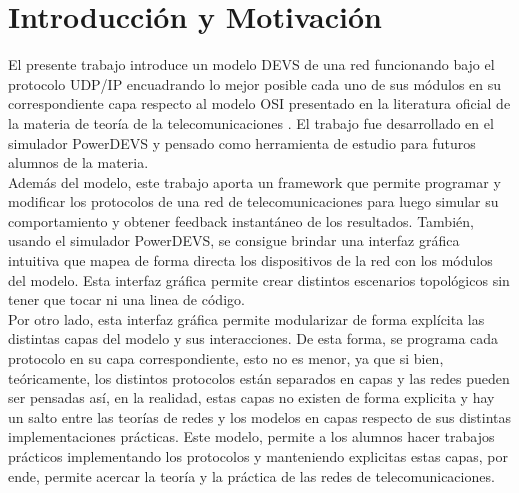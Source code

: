 \documentclass[10pt,a4paper]{article}
\begin{document}

\fecha{\today}



\maketitle

\tableofcontents
\newpage

\section{Introducción y Motivación}

El presente trabajo introduce un modelo DEVS de una red funcionando bajo el protocolo UDP/IP encuadrando lo mejor posible cada uno de sus módulos en su correspondiente capa respecto al modelo OSI presentado en la literatura oficial de la materia de teoría de la telecomunicaciones \cite{peterson2011computer}. El trabajo fue desarrollado en el simulador PowerDEVS y pensado como herramienta de estudio para futuros alumnos de la materia. \\

Además del modelo, este trabajo aporta un framework que permite programar y modificar los protocolos de una red de telecomunicaciones para luego simular su comportamiento y obtener feedback instantáneo de los resultados. También, usando el simulador PowerDEVS, se consigue brindar una interfaz gráfica intuitiva que mapea de forma directa los dispositivos de la red con los módulos del modelo. Esta interfaz gráfica permite crear distintos escenarios topológicos sin tener que tocar ni una linea de código. \\

Por otro lado, esta interfaz gráfica permite modularizar de forma explícita las distintas capas del modelo y sus interacciones. De esta forma, se programa cada protocolo en su capa correspondiente, esto no es menor, ya que si bien, teóricamente, los distintos protocolos están separados en capas y las redes pueden ser pensadas así, en la realidad, estas capas no existen de forma explicita y hay un salto entre las teorías de redes y los modelos en capas respecto de sus distintas implementaciones prácticas. Este modelo, permite a los alumnos hacer trabajos prácticos implementando los protocolos y manteniendo explicitas estas capas, por ende, permite acercar la teoría y la práctica de las redes de telecomunicaciones. \\
\end{document}
